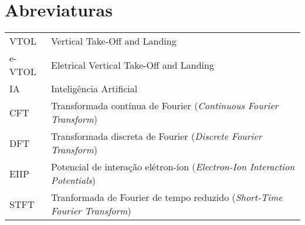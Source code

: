 \chapter{Abreviaturas}

\begin{tabular}{ll}

    VTOL        & Vertical Take-Off and Landing\\
    e-VTOL      & Eletrical Vertical Take-Off and Landing\\
    IA          & Inteligência Artificial\\
    CFT         & Transformada contínua de Fourier (\emph{Continuous Fourier Transform})\\
    DFT         & Transformada discreta de Fourier (\emph{Discrete Fourier Transform})\\
    EIIP        & Potencial de interação elétron-íon (\emph{Electron-Ion Interaction Potentials})\\
    STFT        & Tranformada de Fourier de tempo reduzido (\emph{Short-Time Fourier Transform})\\
    
\end{tabular}